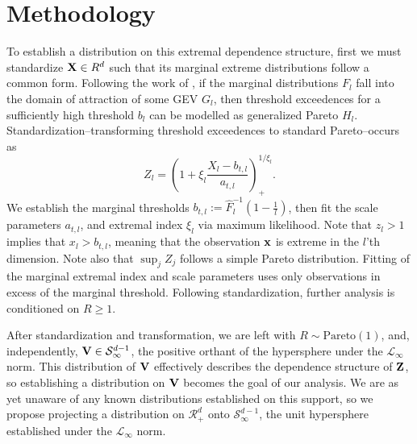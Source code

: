 \section{Methodology}
To establish a distribution on this extremal dependence structure, first we must standardize ${\bf X} \in R^d$
  such that its marginal extreme distributions follow a common form.  Following the work of
  \cite{ferreira2014}, if the marginal distributions $F_{l}$ fall into the domain
  of attraction of some GEV $G_l$, then threshold exceedences for a sufficiently high threshold $b_{l}$
  can be modelled as generalized Pareto $H_l$.  Standardization--transforming threshold exceedences to
  standard Pareto--occurs as
  \begin{equation}
    Z_l = \left(1 + \xi_l\frac{X_l - b_{t,l}}{a_{t,l}}\right)_{+}^{1/\xi_l}.
  \end{equation}
  We establish the marginal thresholds $b_{t,l} := \hat{F}_l^{-1}\left(1 - \frac{1}{l}\right)$,
  then fit the scale parameters $a_{t,l}$, and extremal index $\xi_l$ via maximum likelihood.
  Note that $z_l > 1$ implies that $x_l > b_{t,l}$, meaning that the observation ${\bf x}$ is
  extreme in the $l$'th dimension.  Note also that $\sup_j Z_j$ follows a simple Pareto distribution.
  Fitting of the marginal extremal index and scale parameters uses only observations in excess of the
  marginal threshold. Following standardization, further analysis is conditioned on $R \geq 1$.

After standardization and transformation, we are left with $R\sim\text{Pareto}(1)$, and, independently,
  ${\bf V}\in\mathcal{S}_{\infty}^{d-1}$, the positive orthant of the hypersphere under the
  $\mathcal{L}_{\infty}$ norm.  This distribution of ${\bf V}$ effectively describes the dependence
  structure of ${\bf Z}$, so establishing a distribution on ${\bf V}$ becomes the goal of our analysis.
  We are as yet unaware of any known distributions established on this support, so we propose projecting
  a distribution on $\mathcal{R}_{+}^{d}$ onto $\mathcal{S}_{\infty}^{d-1}$, the unit hypersphere
  established under the $\mathcal{L}_{\infty}$ norm.











